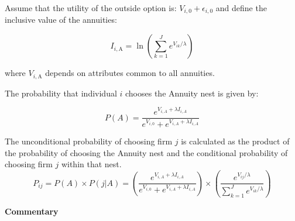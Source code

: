 \documentclass[12pt]{article}
\theoremstyle{plain}
\theoremstyle{plain}
\begin{document}

Assume that the utility of the outside option is: $V_{i, 0 } + \epsilon_{i, 0}$ and define the inclusive value of the annuities: 

\begin{equation}\label{eq:inclusive}
    I_{i, \text{A}} = \ln\left(\sum_{k=1}^{J} e^{V_{ik} / \lambda}\right)
\end{equation}

where $V_{i, \text{A}}$ depends on attributes common to all annuities.


The probability that individual $i$ chooses the Annuity nest is given by:

\begin{equation}
    P(A) = \frac{e^{V_{i,A} + \lambda I_{i, A}}}{e^{V_{i, 0}} + e^{V_{i, A} + \lambda I_{i, A}}}
\end{equation}


The unconditional probability of choosing firm $j$ is calculated as the product of the probability of choosing the Annuity nest and the conditional probability of choosing firm $j$ within that nest.
\begin{equation}
    P_{ij} = P(A) \times P(j|A) =
     \left( \frac{e^{V_{i, A} + \lambda I_{i, A}}}{e^{V_{i, 0}} + e^{V_{i, A} + \lambda I_{i, A}}} \right) \times \left( \frac{e^{V_{ij} / \lambda}}{\sum_{k=1}^{J} e^{V_{ik} / \lambda}} \right)
\end{equation}

\textbf{Commentary}
\end{document}
